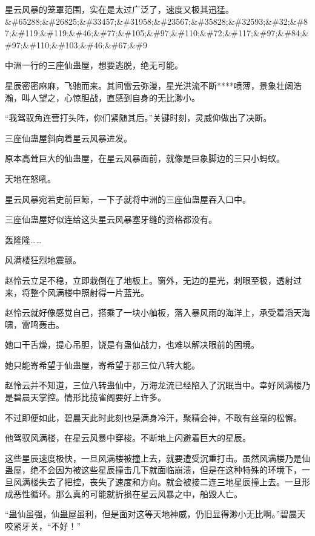 
\begin{this_body}

星云风暴的笼罩范围，实在是太过广泛了，速度又极其迅猛。\&\#65288;\&\#26825;\&\#33457;\&\#31958;\&\#23567;\&\#35828;\&\#32593;\&\#32;\&\#87;\&\#119;\&\#119;\&\#46;\&\#77;\&\#105;\&\#97;\&\#110;\&\#72;\&\#117;\&\#97;\&\#84;\&\#97;\&\#110;\&\#103;\&\#46;\&\#67;\&\#9

中洲一行的三座仙蛊屋，想要逃脱，绝无可能。

星辰密密麻麻，飞驰而来。其间雷云弥漫，星光洪流不断****喷薄，景象壮阔浩瀚，叫人望之，心惊胆战，直感到自身的无比渺小。

“我驾驭角连营打头阵，你们紧随其后。”关键时刻，灵威仰做出了决断。

三座仙蛊屋斜向着星云风暴进发。

原本高耸巨大的仙蛊屋，在星云风暴面前，就像是巨象脚边的三只小蚂蚁。

天地在怒吼。

星云风暴宛若史前巨鲸，一下子就将中洲的三座仙蛊屋吞入口中。

三座仙蛊屋好似连给这头星云风暴塞牙缝的资格都没有。

轰隆隆……

风满楼狂烈地震颤。

赵怜云立足不稳，立即栽倒在了地板上。窗外，无边的星光，刺眼至极，透射过来，将整个风满楼中照射得一片蓝光。

赵怜云就好像感觉自己，搭乘了一块小舢板，落入暴风雨的海洋上，承受着滔天海啸，雷鸣轰击。

她口干舌燥，提心吊胆，饶是有蛊仙战力，也难以解决眼前的困境。

她只能寄希望于仙蛊屋，寄希望于那三位八转大能。

赵怜云并不知道，三位八转蛊仙中，万海龙流已经陷入了沉眠当中。幸好风满楼乃是碧晨天掌控。情形比揽雀阁要好上许多。

不过即便如此，碧晨天此时此刻也是满身冷汗，聚精会神，不敢有丝毫的松懈。

他驾驭风满楼，在星云风暴中穿梭。不断地上闪避着巨大的星辰。

这些星辰速度极快，一旦风满楼被撞上去，就要遭受沉重打击。虽然风满楼乃是仙蛊屋，绝不会因为被这些星辰撞击几下就面临崩溃，但是在这种特殊的环境下，一旦风满楼失去了把控，丧失了速度和方向。就会被接二连三地星辰撞上去。一旦形成恶性循环。那么真的可能就折损在星云风暴之中，船毁人亡。

“蛊仙虽强，仙蛊屋虽利，但是面对这等天地神威，仍旧显得渺小无比啊。”碧晨天咬紧牙关，“不好！”


\end{this_body}
